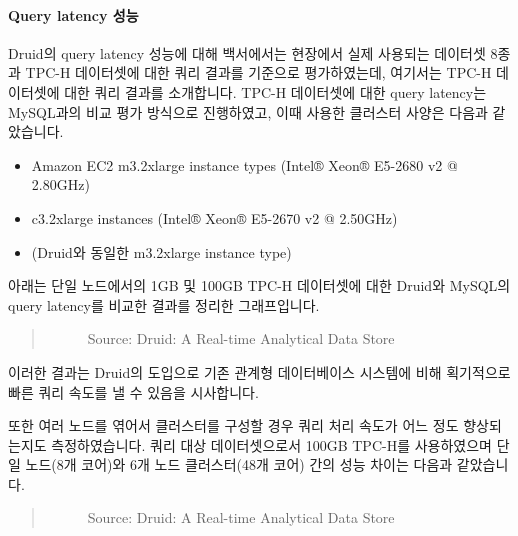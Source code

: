 \documentclass[letterpaper,10pt,english]{sphinxmanual}
\begin{document}
\paragraph{Query latency 성능}
\label{\detokenize{discovery/part01/druid_tests:query-latency}}
Druid의 query latency 성능에 대해 백서에서는 현장에서 실제 사용되는 데이터셋 8종과 TPC-H 데이터셋에 대한 쿼리 결과를 기준으로 평가하였는데, 여기서는 TPC-H 데이터셋에 대한 쿼리 결과를 소개합니다. TPC-H 데이터셋에 대한 query latency는 MySQL과의 비교 평가 방식으로 진행하였고, 이때 사용한 클러스터 사양은 다음과 같았습니다.
\begin{itemize}
\item {} 
 Amazon EC2 m3.2xlarge instance types (Intel® Xeon® E5-2680 v2 @ 2.80GHz)

\item {} 
 c3.2xlarge instances (Intel® Xeon® E5-2670 v2 @ 2.50GHz)

\item {} 
 (Druid와 동일한 m3.2xlarge instance type)

\end{itemize}

아래는 단일 노드에서의 1GB 및 100GB TPC-H 데이터셋에 대한 Druid와 MySQL의 query latency를 비교한 결과를 정리한 그래프입니다.
\begin{quote}

\begin{figure}[H]
\centering
\capstart

\noindent{}
\caption{Source: Druid: A Real-time Analytical Data Store}\label{\detokenize{discovery/part01/druid_tests:id12}}\end{figure}
\end{quote}

이러한 결과는 Druid의 도입으로 기존 관계형 데이터베이스 시스템에 비해 획기적으로 빠른 쿼리 속도를 낼 수 있음을 시사합니다.

또한 여러 노드를 엮어서 클러스터를 구성할 경우 쿼리 처리 속도가 어느 정도 향상되는지도 측정하였습니다. 쿼리 대상 데이터셋으로서 100GB TPC-H를 사용하였으며 단일 노드(8개 코어)와 6개 노드 클러스터(48개 코어) 간의 성능 차이는 다음과 같았습니다.
\begin{quote}

\begin{figure}[H]
\centering
\capstart

\noindent{}
\caption{Source: Druid: A Real-time Analytical Data Store}\label{\detokenize{discovery/part01/druid_tests:id13}}\end{figure}
\end{quote}
\end{document}

